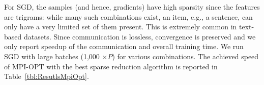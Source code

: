 \documentclass[11pt]{article}
\begin{document}

For SGD, the
samples (and hence, gradients) have high sparsity since the features are
trigrams: while many such combinations exist, an item, e.g., a sentence,
can only have a very limited set of them present. This is extremely
common in text-based datasets. Since communication is lossless,
convergence is preserved and we only report speedup of the communication
and overall training time. We run SGD with large batches (1,000 $\times
P$) for various combinations.  The achieved speed of MPI-OPT with the
best sparse reduction algorithm is reported in
Table~\ref{tbl:ResutlsMpiOpt}. 
\end{document}
